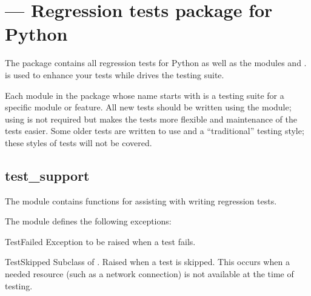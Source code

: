 \section{ ---
         Regression tests package for Python}






The  package contains all regression tests for Python as well as
the modules  and .
 is used to enhance your tests while 
drives the testing suite.

Each module in the  package whose name starts with
 is a testing suite for a specific module or feature.
All new tests should be written using the  module; using
 is not required but makes the tests more flexible and
maintenance of the tests easier.
Some older tests are written to use  and a ``traditional''
testing style; these styles of tests will not be covered.

\begin{seealso}
\end{seealso}


\subsection{test_support \label{test_support-docs}}

The  module contains functions for assisting with writing
regression tests.


The  module defines the following exceptions:

\begin{excdesc}{TestFailed}
Exception to be raised when a test fails.
\end{excdesc}

\begin{excdesc}{TestSkipped}
Subclass of .
Raised when a test is skipped.
This occurs when a needed resource (such as a network connection) is not
available at the time of testing.
\end{excdesc}

